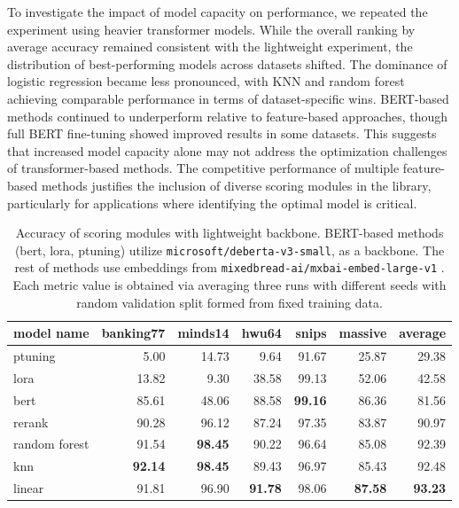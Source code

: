 To investigate the impact of model capacity on performance, we repeated the experiment using heavier transformer models. While the overall ranking by average accuracy remained consistent with the lightweight experiment, the distribution of best-performing models across datasets shifted. The dominance of logistic regression became less pronounced, with KNN and random forest achieving comparable performance in terms of dataset-specific wins. BERT-based methods continued to underperform relative to feature-based approaches, though full BERT fine-tuning showed improved results in some datasets. This suggests that increased model capacity alone may not address the optimization challenges of transformer-based methods. The competitive performance of multiple feature-based methods justifies the inclusion of diverse scoring modules in the library, particularly for applications where identifying the optimal model is critical.

\begin{table}[h]
\centering
\label{tab:scoring_heavy}
\begin{tabular}{l|rrrrr|r}
\toprule
model name & banking77 & minds14 & hwu64 & snips & massive & average \\
\midrule
ptuning & 5.00 & 14.73 & 9.64 & 91.67 & 25.87 & 29.38 \\
lora & 13.82 & 9.30 & 38.58 & 99.13 & 52.06 & 42.58 \\
bert & 85.61 & 48.06 & 88.58 & \textbf{99.16} & 86.36 & 81.56 \\
rerank & 90.28 & 96.12 & 87.24 & 97.35 & 83.87 & 90.97 \\
random forest & 91.54 & \textbf{98.45} & 90.22 & 96.64 & 85.08 & 92.39 \\
knn & \textbf{92.14} & \textbf{98.45} & 89.43 & 96.97 & 85.43 & 92.48 \\
linear & 91.81 & 96.90 & \textbf{91.78} & 98.06 & \textbf{87.58} & \textbf{93.23} \\
\bottomrule
\end{tabular}
\caption{Accuracy of scoring modules with lightweight backbone. BERT-based methods (bert, lora, ptuning) utilize \texttt{microsoft/deberta-v3-small}, \cite{he2021debertav3} as a backbone. The rest of methods use embeddings from \texttt{mixedbread-ai/mxbai-embed-large-v1} \cite{emb2024mxbai,li2023angle}. Each metric value is obtained via averaging three runs with different seeds with random validation split formed from fixed training data.}
\end{table}

